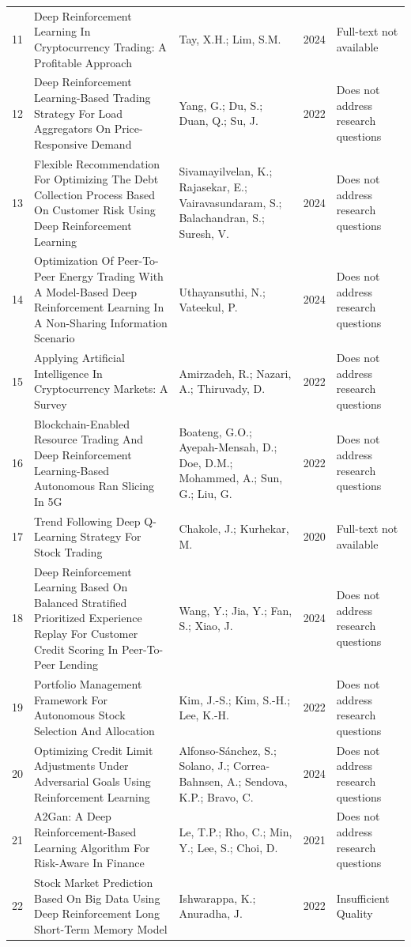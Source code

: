 \begin{small}
\begin{longtable}{r p{5cm} p{4cm} p{1cm} p{5cm}}
11 & Deep Reinforcement Learning In Cryptocurrency Trading: A Profitable Approach & Tay, X.H.; Lim, S.M. & 2024 & Full-text not available \\
12 & Deep Reinforcement Learning-Based Trading Strategy For Load Aggregators On Price-Responsive Demand & Yang, G.; Du, S.; Duan, Q.; Su, J. & 2022 & Does not address research questions \\
13 & Flexible Recommendation For Optimizing The Debt Collection Process Based On Customer Risk Using Deep Reinforcement Learning & Sivamayilvelan, K.; Rajasekar, E.; Vairavasundaram, S.; Balachandran, S.; Suresh, V. & 2024 & Does not address research questions \\
14 & Optimization Of Peer-To-Peer Energy Trading With A Model-Based Deep Reinforcement Learning In A Non-Sharing Information Scenario & Uthayansuthi, N.; Vateekul, P. & 2024 & Does not address research questions \\
15 & Applying Artificial Intelligence In Cryptocurrency Markets: A Survey & Amirzadeh, R.; Nazari, A.; Thiruvady, D. & 2022 & Does not address research questions \\
16 & Blockchain-Enabled Resource Trading And Deep Reinforcement Learning-Based Autonomous Ran Slicing In 5G & Boateng, G.O.; Ayepah-Mensah, D.; Doe, D.M.; Mohammed, A.; Sun, G.; Liu, G. & 2022 & Does not address research questions \\
17 & Trend Following Deep Q-Learning Strategy For Stock Trading & Chakole, J.; Kurhekar, M. & 2020 & Full-text not available \\
18 & Deep Reinforcement Learning Based On Balanced Stratified Prioritized Experience Replay For Customer Credit Scoring In Peer-To-Peer Lending & Wang, Y.; Jia, Y.; Fan, S.; Xiao, J. & 2024 & Does not address research questions \\
19 & Portfolio Management Framework For Autonomous Stock Selection And Allocation & Kim, J.-S.; Kim, S.-H.; Lee, K.-H. & 2022 & Does not address research questions \\
20 & Optimizing Credit Limit Adjustments Under Adversarial Goals Using Reinforcement Learning & Alfonso-Sánchez, S.; Solano, J.; Correa-Bahnsen, A.; Sendova, K.P.; Bravo, C. & 2024 & Does not address research questions \\
21 & A2Gan: A Deep Reinforcement-Based Learning Algorithm For Risk-Aware In Finance & Le, T.P.; Rho, C.; Min, Y.; Lee, S.; Choi, D. & 2021 & Does not address research questions \\
22 & Stock Market Prediction Based On Big Data Using Deep Reinforcement Long Short-Term Memory Model & Ishwarappa, K.; Anuradha, J. & 2022 & Insufficient Quality \\

\end{longtable}
\end{small}
